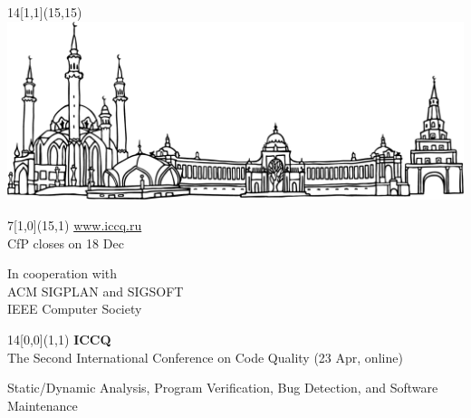 \documentclass{article}
\begin{document}
\selectfont
\raggedbottom
\raggedright
\setlength{\topskip}{6pt}
\setlength{\parindent}{0pt} %
\setlength{\parskip}{6pt} %
\color{xblack}

\begin{textblock}{14}[1,1](15,15)
  \raggedleft
  \includegraphics[width=14\TPHorizModule]{../../cfp/kazan}
\end{textblock}

\begin{textblock}{7}[1,0](15,1)
  \raggedleft\large
  \underline{www.iccq.ru} \\
  CfP closes on 18 Dec

  In cooperation with \\
  ACM SIGPLAN and SIGSOFT \\
  IEEE Computer Society
\end{textblock}

\begin{textblock}{14}[0,0](1,1)
  {
  \fontsize{42}{42}
  \selectfont
  \bfseries
  ICCQ
  }\\[12pt]

  \Large
  The Second International Conference \newline
  on Code Quality (23 Apr, online)

  Static/Dynamic Analysis, Program Verification, \newline
  Bug Detection, and Software Maintenance
\end{textblock}
\end{document}
